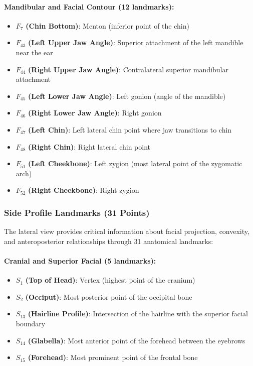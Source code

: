 \paragraph{Mandibular and Facial Contour (12 landmarks):}
\begin{itemize}
    \item $F_7$ \textbf{(Chin Bottom)}: Menton (inferior point of the chin)
    \item $F_{43}$ \textbf{(Left Upper Jaw Angle)}: Superior attachment of the left mandible near the ear
    \item $F_{44}$ \textbf{(Right Upper Jaw Angle)}: Contralateral superior mandibular attachment
    \item $F_{45}$ \textbf{(Left Lower Jaw Angle)}: Left gonion (angle of the mandible)
    \item $F_{46}$ \textbf{(Right Lower Jaw Angle)}: Right gonion
    \item $F_{47}$ \textbf{(Left Chin)}: Left lateral chin point where jaw transitions to chin
    \item $F_{48}$ \textbf{(Right Chin)}: Right lateral chin point
    \item $F_{51}$ \textbf{(Left Cheekbone)}: Left zygion (most lateral point of the zygomatic arch)
    \item $F_{52}$ \textbf{(Right Cheekbone)}: Right zygion
\end{itemize}

\subsubsection{Side Profile Landmarks (31 Points)}

The lateral view provides critical information about facial projection, convexity, and anteroposterior relationships through 31 anatomical landmarks:

\paragraph{Cranial and Superior Facial (5 landmarks):}
\begin{itemize}
    \item $S_1$ \textbf{(Top of Head)}: Vertex (highest point of the cranium)
    \item $S_2$ \textbf{(Occiput)}: Most posterior point of the occipital bone
    \item $S_{13}$ \textbf{(Hairline Profile)}: Intersection of the hairline with the superior facial boundary
    \item $S_{14}$ \textbf{(Glabella)}: Most anterior point of the forehead between the eyebrows
    \item $S_{15}$ \textbf{(Forehead)}: Most prominent point of the frontal bone
\end{itemize}


